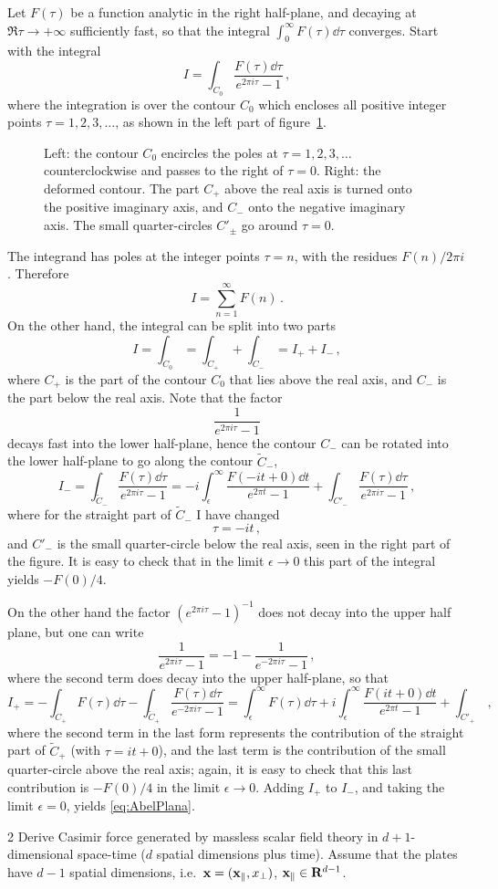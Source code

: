 Let $F(\tau)$ be a function analytic in the right half-plane, and decaying at
$\Re\tau\to+\infty$ sufficiently fast, so that the integral
$\int_0^\infty F(\tau)\dd\tau$ converges. Start with the integral
\[
I=\int_{C_0}\frac{F(\tau)\dd\tau}{e^{2\pi i\tau}-1}\,,
\]
where the integration is over the contour $C_0$ which encloses all positive
integer points $\tau=1,2,3,\dots$, as shown in the left part of
figure~\ref{fig:abelplana}.
\begin{figure}[ht]
\centering{}
\caption{Left: the contour $C_0$ encircles the poles at $\tau=1,2,3,\dots$
counterclockwise and passes to the right of $\tau=0$. Right: the deformed
contour. The part $C_+$ above the real axis is turned onto the positive
imaginary axis, and $C_-$ onto the negative imaginary axis. The small
quarter-circles $C'_\pm$ go around $\tau=0$.}
\label{fig:abelplana}
\end{figure}
The integrand has poles at the integer points $\tau=n$, with the residues
$F(n)/2\pi i$. Therefore
\[
I=\sum_{n=1}^\infty F(n)\,.
\]
On the other hand, the integral can be split into two parts
\[
I=\int_{C_0}=\int_{C_+}+\int_{C_-}=I_++I_-\,,
\]
where $C_+$ is the part of the contour $C_0$ that lies above the real axis,
and $C_-$ is the part below the real axis. Note that the factor
\[
\frac1{e^{2\pi i\tau}-1}
\]
decays fast into the lower half-plane, hence the contour $C_-$ can be rotated
into the lower half-plane to go along the contour $\tilde C_-$,
\[
I_-=\int_{\tilde C_-}\frac{F(\tau)\dd\tau}{e^{2\pi i\tau}-1}
=-i\int_\epsilon^\infty\frac{F(-it+0)\dd t}{e^{2\pi t}-1}+\int_{C'_-}\frac{F(\tau)\dd\tau}{e^{2\pi i\tau}-1}\,,
\]
where for the straight part of $\tilde C_-$ I have changed
\[
\tau=-it\,,
\]
and $C'_-$ is the small quarter-circle below the real axis, seen in the right
part of the figure. It is easy to check that in the limit $\epsilon\to0$ this
part of the integral yields $-F(0)/4$.

On the other hand the factor $(e^{2\pi i\tau}-1)^{-1}$ does not decay into the
upper half plane, but one can write
\[
\frac1{e^{2\pi i\tau}-1}=-1-\frac1{e^{-2\pi i\tau}-1}\,,
\]
where the second term does decay into the upper half-plane, so that
\[
I_+=-\int_{C_+}F(\tau)\dd\tau-\int_{\tilde C_+}\frac{F(\tau)\dd\tau}{e^{-2\pi i\tau}-1}
=\int_\epsilon^\infty F(\tau)\dd\tau+i\int_\epsilon^\infty\frac{F(it+0)\dd t}{e^{2\pi t}-1}+\int_{C'_+}\,,
\]
where the second term in the last form represents the contribution of the
straight part of $\tilde C_+$ (with $\tau=it+0$), and the last term is the
contribution of the small quarter-circle above the real axis; again, it is
easy to check that this last contribution is $-F(0)/4$ in the limit
$\epsilon\to0$. Adding $I_+$ to $I_-$, and taking the limit $\epsilon=0$,
yields \eqref{eq:AbelPlana}.

\begin{hwproblem}{2}\label{hw:2}
Derive Casimir force generated by massless scalar field theory in
$d+1$-dimensional space-time ($d$ spatial dimensions plus time). Assume that
the plates have $d-1$ spatial dimensions, i.e.\
$\mathbf{x}=(\mathbf{x}_\parallel,x_\perp)$, $\mathbf{x}_\parallel\in\mathbf{R}^{d-1}$.
\end{hwproblem}
